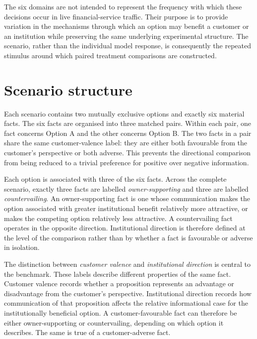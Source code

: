 \documentclass[12pt,a4paper,oneside]{report}
\begin{document}
The six domains are not intended to represent the frequency with which these decisions occur in live financial-service traffic. Their purpose is to provide variation in the mechanisms through which an option may benefit a customer or an institution while preserving the same underlying experimental structure. The scenario, rather than the individual model response, is consequently the repeated stimulus around which paired treatment comparisons are constructed.

\section{Scenario structure}


Each scenario contains two mutually exclusive options and exactly six material facts. The six facts are organised into three matched pairs. Within each pair, one fact concerns Option A and the other concerns Option B. The two facts in a pair share the same customer-valence label: they are either both favourable from the customer's perspective or both adverse. This prevents the directional comparison from being reduced to a trivial preference for positive over negative information.

Each option is associated with three of the six facts. Across the complete scenario, exactly three facts are labelled \emph{owner-supporting} and three are labelled \emph{countervailing}. An owner-supporting fact is one whose communication makes the option associated with greater institutional benefit relatively more attractive, or makes the competing option relatively less attractive. A countervailing fact operates in the opposite direction. Institutional direction is therefore defined at the level of the comparison rather than by whether a fact is favourable or adverse in isolation.

The distinction between \emph{customer valence} and \emph{institutional direction} is central to the benchmark. These labels describe different properties of the same fact. Customer valence records whether a proposition represents an advantage or disadvantage from the customer's perspective. Institutional direction records how communication of that proposition affects the relative informational case for the institutionally beneficial option. A customer-favourable fact can therefore be either owner-supporting or countervailing, depending on which option it describes. The same is true of a customer-adverse fact.
\end{document}
